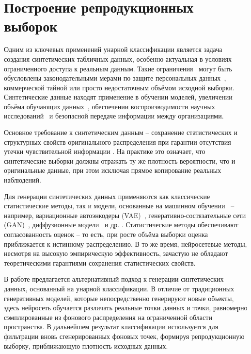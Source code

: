 \section{Построение репродукционных выборок}


Одним из ключевых применений унарной классификации является задача создания синтетических табличных данных, особенно актуальная в условиях ограниченного доступа к реальным данным. Такие ограничения~\cite{gal2023synthetic} могут быть обусловлены законодательными мерами по защите персональных данных~\cite{joshi2024synthetic}, коммерческой тайной или просто недостаточным объёмом исходной выборки. Синтетические данные находят применение в обучении моделей, увеличении объёма обучающих данных~\cite{belyaeva2020synthetic}, обеспечении воспроизводимости научных исследований~\cite{grund2022using} и безопасной передаче информации между организациями.

Основное требование к синтетическим данным -- сохранение статистических и структурных свойств оригинального распределения при гарантии отсутствия утечки чувствительной информации \cite{bauer2024comprehensive}. На практике это означает, что синтетические выборки должны отражать ту же плотность вероятности, что и оригинальные данные, при этом исключая прямое копирование реальных наблюдений.

Для генерации синтетических данных применяются как классические статистические методы, так и модели, основанные на машинном обучении~\cite{figueira2022survey} -- например, вариационные автоэнкодеры (VAE)~\cite{wan2017variational}, генеративно-состязательные сети (GAN)~\cite{jordon2018pate}, диффузионные модели~\cite{villaizan2024diffusion} и др. \cite{akkem2024comprehensive}. Статистические методы обеспечивают согласованность оценок -- то есть, при росте объёма выборки оценка приближается к истинному распределению. В то же время, нейросетевые методы, несмотря на высокую эмпирическую эффективность, зачастую не обладают теоретическими гарантиями сохранения статистических свойств.

В работе \cite{synthetic2025unary} предлагается альтернативный подход к генерации синтетических данных, основанный на унарной классификации. В отличие от традиционных генеративных моделей, которые непосредственно генерируют новые объекты, здесь нейросеть обучается различать реальные точки данных и точки, равномерно сэмплированные из фонового распределения на ограниченной области пространства. В дальнейшем результат классификации используется для фильтрации вновь сгенерированных фоновых точек, формируя репродукционную выборку, приближающую плотность исходных данных.

